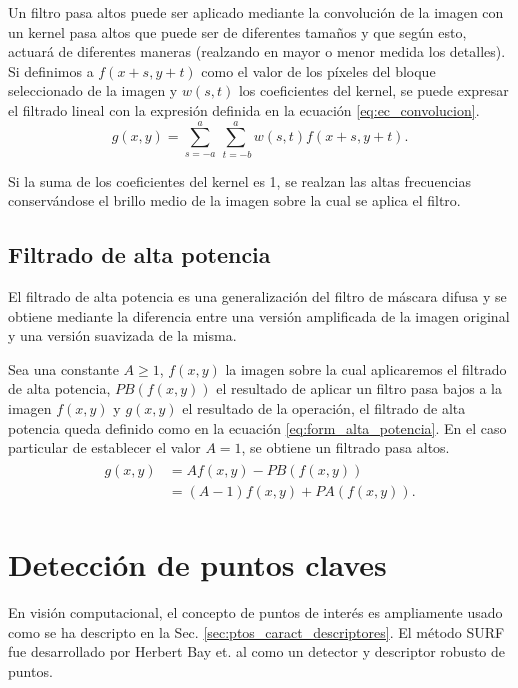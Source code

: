 Un filtro pasa altos puede ser aplicado mediante la convolución de la imagen con un kernel pasa altos que puede ser de diferentes tamaños y que según esto, actuará de diferentes maneras (realzando en mayor o menor medida los detalles). Si definimos a $f(x+s, y+t)$ como el valor de los píxeles del bloque seleccionado de la imagen y $w(s,t)$ los coeficientes del kernel, se puede expresar el filtrado lineal con la expresión definida en la ecuación \eqref{eq:ec_convolucion}.
\begin{equation}
g(x,y)=\sum_{s=-a}^{a}\sum_{\; t=-b}^{a}w(s,t)f(x+s,y+t).\label{eq:ec_convolucion}
\end{equation}

Si la suma de los coeficientes del kernel es 1, se realzan las altas frecuencias conservándose el brillo medio de la imagen sobre la cual se aplica el filtro.
\subsection{Filtrado de alta potencia}
\label{subsec:iluminacion_altapotencia}
El filtrado de alta potencia es una generalización del filtro de máscara difusa y se obtiene mediante la diferencia entre una versión amplificada de la imagen original y una versión suavizada de la misma.

Sea una constante $A \geq 1$, $f(x,y)$ la imagen sobre la cual aplicaremos el filtrado de alta potencia, $PB(f(x,y))$ el resultado de aplicar un filtro pasa bajos a la imagen $f(x,y)$ y $g(x,y)$ el resultado de la operación, el filtrado de alta potencia queda definido como en la ecuación \eqref{eq:form_alta_potencia}. En el caso particular de establecer el valor $A=1$, se obtiene un filtrado pasa altos.
\begin{eqnarray}
\label{eq:form_alta_potencia}
\begin{aligned}
  g(x,y)&=Af(x,y)-PB(f(x,y))\\
  &= (A-1)f(x,y)+PA(f(x,y)).
\end{aligned}
\end{eqnarray}
\section{Detección de puntos claves}
  \label{sec:detec_ptos_claves}
  En visión computacional, el concepto de puntos de interés es ampliamente usado como se ha descripto en la Sec. \ref{sec:ptos_caract_descriptores}. El método SURF fue desarrollado por Herbert Bay et. al \cite{Bay:2008:SRF} como un detector y descriptor robusto de puntos.
  
